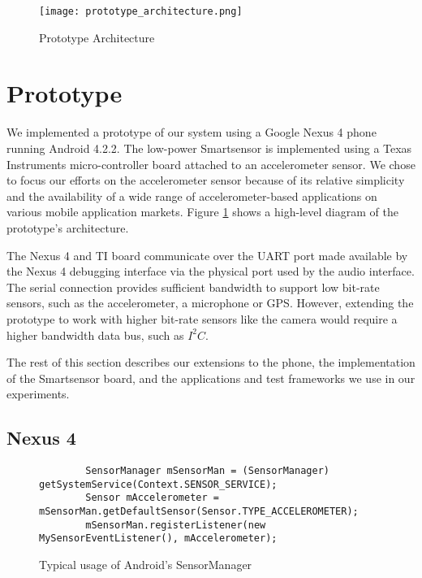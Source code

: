 
\begin{figure}[t]
	\texttt{[image: prototype\_architecture.png]}
	\caption{Prototype Architecture}
    \label{fig:prototypeArchitecture}
\end{figure}

\section{Prototype}
\label{sec:prototype}

We implemented a prototype of our system using a Google Nexus 4 phone
running Android 4.2.2.  The low-power Smartsensor is implemented using
a Texas Instruments micro-controller board attached to an
accelerometer sensor.  We chose to focus our efforts on the
accelerometer sensor because of its relative simplicity and the
availability of a wide range of accelerometer-based applications on
various mobile application markets.  Figure
\ref{fig:prototypeArchitecture} shows a high-level diagram of the
prototype's architecture.

The Nexus 4 and TI board communicate over the UART port made available
by the Nexus 4 debugging interface via the physical port used by the
audio interface.  The serial connection provides sufficient bandwidth
to support low bit-rate sensors, such as the accelerometer, a
microphone or GPS.  However, extending the prototype to work with
higher bit-rate sensors like the camera would require a higher
bandwidth data bus, such as $I^2C$.

The rest of this section describes our extensions to the phone, the
implementation of the Smartsensor board, and the applications and test
frameworks we use in our experiments.

\subsection{Nexus 4}
\label{subsec:nexus}

\begin{figure*}[t]
{\small
	\begin{verbatim}
		SensorManager mSensorMan = (SensorManager) getSystemService(Context.SENSOR_SERVICE);
		Sensor mAccelerometer = mSensorMan.getDefaultSensor(Sensor.TYPE_ACCELEROMETER);
		mSensorMan.registerListener(new MySensorEventListener(), mAccelerometer);
	\end{verbatim}
}
	\caption{Typical usage of Android's SensorManager}
    \label{fig:androidSensorCodeNormal}
\end{figure*}

